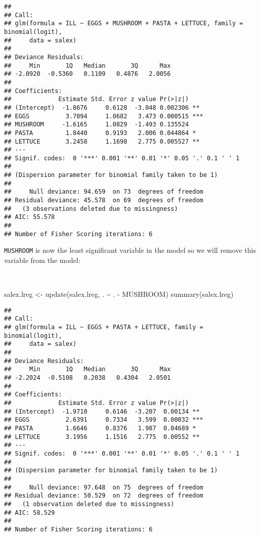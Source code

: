 \documentclass[
  12pt,
  a4paper]{book}
\newenvironment{Shaded}{\begin{snugshade}}{\end{snugshade}}
\newcommand{\FunctionTok}[1]{\textcolor[rgb]{0.00,0.00,0.00}{#1}}
\newcommand{\NormalTok}[1]{#1}
\newcommand{\OtherTok}[1]{\textcolor[rgb]{0.56,0.35,0.01}{#1}}
\newcommand{\SpecialCharTok}[1]{\textcolor[rgb]{0.00,0.00,0.00}{#1}}
\begin{document}
\begin{verbatim}
## 
## Call:
## glm(formula = ILL ~ EGGS + MUSHROOM + PASTA + LETTUCE, family = binomial(logit), 
##     data = salex)
## 
## Deviance Residuals: 
##     Min       1Q   Median       3Q      Max  
## -2.0920  -0.5360   0.1109   0.4876   2.0056  
## 
## Coefficients:
##             Estimate Std. Error z value Pr(>|z|)    
## (Intercept)  -1.8676     0.6128  -3.048 0.002306 ** 
## EGGS          3.7094     1.0682   3.473 0.000515 ***
## MUSHROOM     -1.6165     1.0829  -1.493 0.135524    
## PASTA         1.8440     0.9193   2.006 0.044864 *  
## LETTUCE       3.2458     1.1698   2.775 0.005527 ** 
## ---
## Signif. codes:  0 '***' 0.001 '**' 0.01 '*' 0.05 '.' 0.1 ' ' 1
## 
## (Dispersion parameter for binomial family taken to be 1)
## 
##     Null deviance: 94.659  on 73  degrees of freedom
## Residual deviance: 45.578  on 69  degrees of freedom
##   (3 observations deleted due to missingness)
## AIC: 55.578
## 
## Number of Fisher Scoring iterations: 6
\end{verbatim}

\newpage

\texttt{MUSHROOM} is now the least significant variable in the model so we will remove this variable from the model:

~

\begin{Shaded}
\begin{Highlighting}[]
\NormalTok{salex.lreg }\OtherTok{\textless{}{-}} \FunctionTok{update}\NormalTok{(salex.lreg, . }\SpecialCharTok{\textasciitilde{}}\NormalTok{ . }\SpecialCharTok{{-}}\NormalTok{ MUSHROOM)}
\FunctionTok{summary}\NormalTok{(salex.lreg)}
\end{Highlighting}
\end{Shaded}

\begin{verbatim}
## 
## Call:
## glm(formula = ILL ~ EGGS + PASTA + LETTUCE, family = binomial(logit), 
##     data = salex)
## 
## Deviance Residuals: 
##     Min       1Q   Median       3Q      Max  
## -2.2024  -0.5108   0.2038   0.4304   2.0501  
## 
## Coefficients:
##             Estimate Std. Error z value Pr(>|z|)    
## (Intercept)  -1.9710     0.6146  -3.207  0.00134 ** 
## EGGS          2.6391     0.7334   3.599  0.00032 ***
## PASTA         1.6646     0.8376   1.987  0.04689 *  
## LETTUCE       3.1956     1.1516   2.775  0.00552 ** 
## ---
## Signif. codes:  0 '***' 0.001 '**' 0.01 '*' 0.05 '.' 0.1 ' ' 1
## 
## (Dispersion parameter for binomial family taken to be 1)
## 
##     Null deviance: 97.648  on 75  degrees of freedom
## Residual deviance: 50.529  on 72  degrees of freedom
##   (1 observation deleted due to missingness)
## AIC: 58.529
## 
## Number of Fisher Scoring iterations: 6
\end{verbatim}
\end{document}
